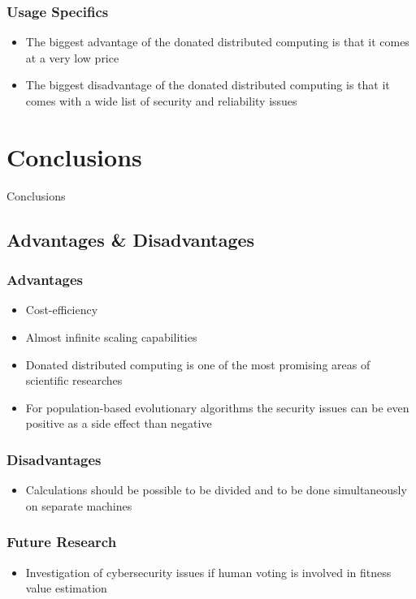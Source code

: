 \documentclass{beamer}
\begin{document}
\begin{frame}
\frametitle{Usage Specifics}
\begin{itemize}
	\item The biggest advantage of the donated distributed computing is that it comes at a very low price
	\item The biggest disadvantage of the donated distributed computing is that it comes with a wide list of security and reliability issues
\end{itemize}
\end{frame}

\section{Conclusions}

\begin{frame}
\center \huge{Conclusions}
\end{frame}

\subsection{Advantages \& Disadvantages}

\begin{frame}
\frametitle{Advantages}
\begin{itemize}
	\item Cost-efficiency
	\item Almost infinite scaling capabilities
	\item Donated distributed computing is one of the most promising areas of scientific researches
	\item For population-based evolutionary algorithms the security issues can be even positive as a side effect than negative
\end{itemize}
\end{frame}

\begin{frame}
\frametitle{Disadvantages}
\begin{itemize}
	\item Calculations should be possible to be divided and to be done simultaneously on separate machines
\end{itemize}
\end{frame}

\begin{frame}
\frametitle{Future Research}
\begin{itemize}
	\item Investigation of cybersecurity issues if human voting is involved in fitness value estimation
\end{itemize}
\end{frame}
\end{document}
